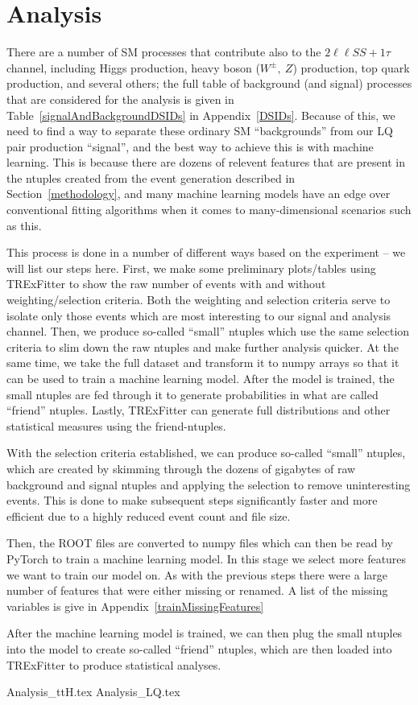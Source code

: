 \section{Analysis}
    There are a number of SM processes that contribute also to the $2\ell\ell SS + 1\tau$ channel, including Higgs production, heavy boson ($W^{\pm},\ Z$) production, top quark production, and several others; the full table of background (and signal) processes that are considered for the analysis is given in Table~\ref{signalAndBackgroundDSIDs} in Appendix~\ref{DSIDs}. Because of this, we need to find a way to separate these ordinary SM ``backgrounds'' from our LQ pair production ``signal'', and the best way to achieve this is with machine learning. This is because there are dozens of relevent features that are present in the ntuples created from the event generation described in Section~\ref{methodology}, and many machine learning models have an edge over conventional fitting algorithms when it comes to many-dimensional scenarios such as this.

    This process is done in a number of different ways based on the experiment -- we will list our steps here. First, we make some preliminary plots/tables using TRExFitter to show the raw number of events with and without weighting/selection criteria. Both the weighting and selection criteria serve to isolate only those events which are most interesting to our signal and analysis channel. Then, we produce so-called ``small'' ntuples which use the same selection criteria to slim down the raw ntuples and make further analysis quicker. At the same time, we take the full dataset and transform it to numpy arrays so that it can be used to train a machine learning model. After the model is trained, the small ntuples are fed through it to generate probabilities in what are called ``friend'' ntuples. Lastly, TRExFitter can generate full distributions and other statistical measures using the friend-ntuples.
    

    

    With the selection criteria established, we can produce so-called ``small'' ntuples, which are created by skimming through the dozens of gigabytes of raw background and signal ntuples and applying the selection to remove uninteresting events. This is done to make subsequent steps significantly faster and more efficient due to a highly reduced event count and file size. 
    
    Then, the ROOT files are converted to numpy files which can then be read by PyTorch to train a machine learning model. In this stage we select more features we want to train our model on. As with the previous steps there were a large number of features that were either missing or renamed. A list of the missing variables is give in Appendix~\ref{trainMissingFeatures}
    
    After the machine learning model is trained, we can then plug the small ntuples into the model to create so-called ``friend'' ntuples, which are then loaded into TRExFitter to produce statistical analyses.



    {Analysis_ttH.tex}
    {Analysis_LQ.tex}